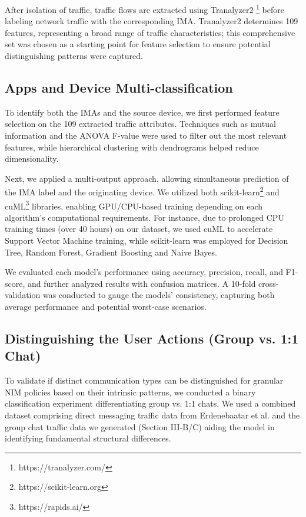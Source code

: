 \documentclass[conference]{IEEEtran}
\begin{document}
After isolation of traffic, traffic flows are extracted using Tranalyzer2 \footnote{https://tranalyzer.com/} before labeling network traffic with the corresponding IMA. Tranalyzer2 determines 109 features, representing a broad range of traffic characteristics; this comprehensive set was chosen as a starting point for feature selection to ensure potential distinguishing patterns were captured.


\subsection{Apps and Device Multi-classification}
To identify both the IMAs and the source device, we first performed feature selection on the 109 extracted traffic attributes. Techniques such as mutual information and the ANOVA F-value were used to filter out the most relevant features, while hierarchical clustering with dendrograms helped reduce dimensionality.

Next, we applied a multi-output approach, allowing simultaneous prediction of the IMA label and the originating device. We utilized both scikit-learn\footnote{https://scikit-learn.org} and cuML\footnote{https://rapids.ai/} libraries, enabling GPU/CPU-based training depending on each algorithm’s computational requirements. For instance, due to prolonged CPU training times (over 40 hours) on our dataset, we used cuML to accelerate Support Vector Machine training, while scikit-learn was employed for Decision Tree, Random Forest, Gradient Boosting and Naive Bayes.

We evaluated each model’s performance using accuracy, precision, recall, and F1-score, and further analyzed results with confusion matrices. A 10-fold cross-validation was conducted to gauge the models’ consistency, capturing both average performance and potential worst-case scenarios.

\subsection{Distinguishing the User Actions (Group vs. 1:1 Chat)}
To validate if distinct communication types can be distinguished for granular NIM policies based on their intrinsic patterns, we conducted a binary classification experiment differentiating group vs. 1:1 chats. We used a combined dataset comprising direct messaging traffic data from Erdenebaatar et al.\cite{b1} and the group chat traffic data we generated (Section III-B/C) aiding the model in identifying fundamental structural differences.
\end{document}
